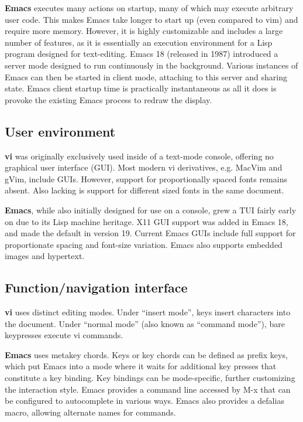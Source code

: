 \documentclass[10pt,twoside,openright]{memoir}
\begin{document}
\textbf{Emacs} executes many actions on startup, many of which may execute arbitrary user code. This makes Emacs take longer to start up (even compared to vim) and require more memory. However, it is highly customizable and includes a large number of features, as it is essentially an execution environment for a Lisp program designed for text-editing. Emacs 18 (released in 1987) introduced a server mode designed to run continuously in the background. Various instances of Emacs can then be started in client mode, attaching to this server and sharing state. Emacs client startup time is practically instantaneous as all it does is provoke the existing Emacs process to redraw the display.

\subsection{User environment}

\textbf{vi} was originally exclusively used inside of a text-mode console, offering no graphical user interface (GUI). Most modern vi derivatives, e.g. MacVim and gVim, include GUIs. However, support for proportionally spaced fonts remains absent. Also lacking is support for different sized fonts in the same document.

\textbf{Emacs}, while also initially designed for use on a console, grew a TUI fairly early on due to its Lisp machine heritage. X11 GUI support was added in Emacs 18, and made the default in version 19. Current Emacs GUIs include full support for proportionate spacing and font-size variation. Emacs also supports embedded images and hypertext.

\subsection{Function/navigation interface}

\textbf{vi} uses distinct editing modes. Under ``insert mode'', keys insert characters into the document. Under ``normal mode'' (also known as ``command mode''), bare keypresses execute vi commands.

\textbf{Emacs} uses metakey chords. Keys or key chords can be defined as prefix keys, which put Emacs into a mode where it waits for additional key presses that constitute a key binding. Key bindings can be mode-specific, further customizing the interaction style. Emacs provides a command line accessed by M-x that can be configured to autocomplete in various ways. Emacs also provides a defalias macro, allowing alternate names for commands.
\end{document}
